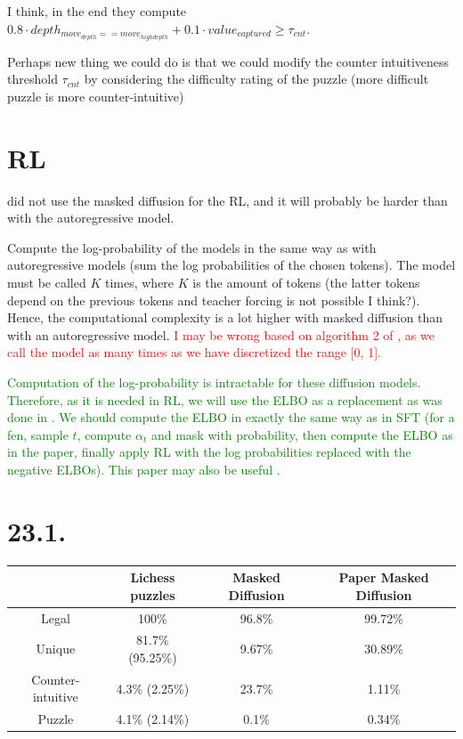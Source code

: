 \documentclass[a4paper, 12pt]{article}
\begin{document}
I think, in the end they compute $0.8\cdot depth_{move_{depth} == move_{high depth}} + 0.1\cdot value_{captured} \ge \tau_{cnt}$.

Perhaps new thing we could do is that we could modify the counter intuitiveness threshold $\tau_{cnt}$ by considering the difficulty rating of the puzzle (more difficult puzzle is more counter-intuitive)



\section{RL}

\cite{feng2025generatingcreativechesspuzzles} did not use the masked diffusion for the RL, and it will probably be harder than with the autoregressive model.

Compute the log-probability of the models in the same way as with autoregressive models (sum the log probabilities of the chosen tokens). The model must be called $K$ times, where $K$ is the amount of tokens (the latter tokens depend on the previous tokens and teacher forcing is not possible I think?). Hence, the computational complexity is a lot higher with masked diffusion than with an autoregressive model. \textcolor{red}{I may be wrong based on algorithm 2 of \cite{ruoss2024amortizedplanninglargescaletransformers}, as we call the model as many times as we have discretized the range [0, 1].}

\textcolor{Green}{Computation of the log-probability is intractable for these diffusion models. Therefore, as it is needed in RL, we will use the ELBO as a replacement as was done in \cite{ou2025principledrldiffusionllms}. We should compute the ELBO in exactly the same way as in SFT (for a fen, sample $t$, compute $\alpha_t$ and mask with probability, then compute the ELBO as in the paper, finally apply RL with the log probabilities replaced with the negative ELBOs). This paper may also be useful \cite{rojas2025improvingreasoningdiffusionlanguage}.}


\section{23.1.}

\clearpage

\begin{table}
    \centering
    \begin{tabular}{|c|c|c|c|}
        \hline
        & Lichess puzzles & Masked Diffusion & Paper Masked Diffusion \\
        \hline
        Legal & 100\% & 96.8\% & 99.72\%\\
        \hline
        Unique & 81.7\% (95.25\%) & 9.67\% & 30.89\%\\
        \hline
        Counter-intuitive & 4.3\% (2.25\%) & 23.7\% & 1.11\%\\
        \hline
        Puzzle & 4.1\% (2.14\%) & 0.1\% & 0.34\%\\
        \hline
    \end{tabular}
\end{table}
\end{document}
